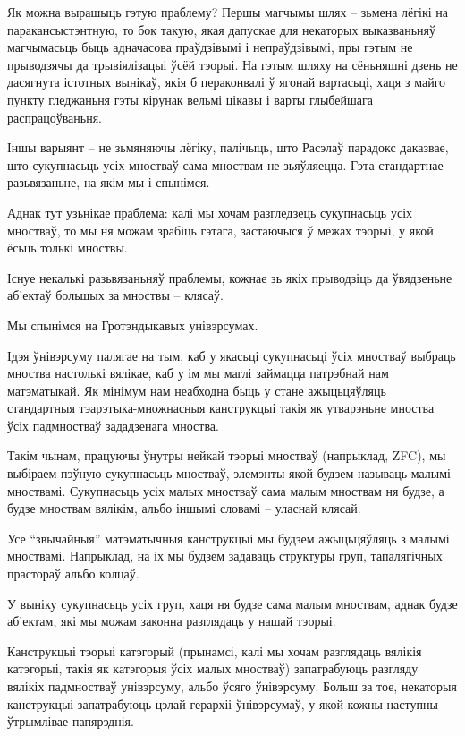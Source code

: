 \documentclass[a4paper,12pt]{book}
\begin{document}
Як можна вырашыць гэтую праблему? Першы магчымы шлях -- зьмена лёгікі
на паракансыстэнтную, то бок такую, якая дапускае для некаторых
выказваньняў магчымасьць быць адначасова праўдзівымі і непраўдзівымі,
пры гэтым не прыводзячы да трывіялізацыі ўсёй тэорыі. На гэтым шляху
на сёньняшні дзень не дасягнута істотных вынікаў, якія б пераконвалі ў
ягонай вартасьці, хаця з майго пункту гледжаньня гэты кірунак вельмі
цікавы і варты глыбейшага распрацоўваньня.

Іншы варыянт -- не зьмяняючы лёгіку, палічыць, што Расэлаў парадокс
даказвае, што сукупнасьць усіх мностваў сама мноствам не
зьяўляецца. Гэта стандартнае разьвязаньне, на якім мы і спынімся.

Аднак тут узьнікае праблема: калі мы хочам разгледзець сукупнасьць
усіх мностваў, то мы ня можам зрабіць гэтага, застаючыся ў межах
тэорыі, у якой ёсьць толькі мноствы.

Існуе некалькі разьвязаньняў праблемы, кожнае зь якіх прыводзіць да
ўвядзеньне аб'ектаў большых за мноствы -- клясаў.

Мы спынімся на Гротэндыкавых унівэрсумах.

Ідэя ўнівэрсуму палягае на тым, каб у якасьці сукупнасьці ўсіх
мностваў выбраць мноства настолькі вялікае, каб у ім мы маглі займацца
патрэбнай нам матэматыкай. Як мінімум нам неабходна быць у стане
ажыцьцяўляць стандартныя тэарэтыка-множнасныя канструкцыі такія як
утварэньне мноства ўсіх падмностваў зададзенага мноства.

Такім чынам, працуючы ўнутры нейкай тэорыі мностваў (напрыклад, ZFC),
мы выбіраем пэўную сукупнасьць мностваў, элемэнты якой будзем называць
малымі мноствамі. Сукупнасьць усіх малых мностваў сама
малым мноствам ня будзе, а будзе мноствам вялікім, альбо іншымі
словамі -- уласнай клясай.

Усе ``звычайныя'' матэматычныя канструкцыі мы будзем ажыцьцяўляць з
малымі мноствамі. Напрыклад, на іх мы будзем задаваць структуры
груп, тапалягічных прастораў альбо колцаў.

У выніку сукупнасьць усіх груп, хаця ня будзе сама малым мноствам,
аднак будзе аб'ектам, які мы можам законна разглядаць у нашай тэорыі.

Канструкцыі тэорыі катэгорый (прынамсі, калі мы хочам разглядаць
вялікія катэгорыі, такія як катэгорыя ўсіх малых мностваў)
запатрабуюць разгляду вялікіх падмностваў унівэрсуму, альбо ўсяго
ўнівэрсуму. Больш за тое, некаторыя канструкцыі запатрабуюць цэлай
герархіі ўнівэрсумаў, у якой кожны наступны ўтрымлівае папярэднія.
\end{document}
